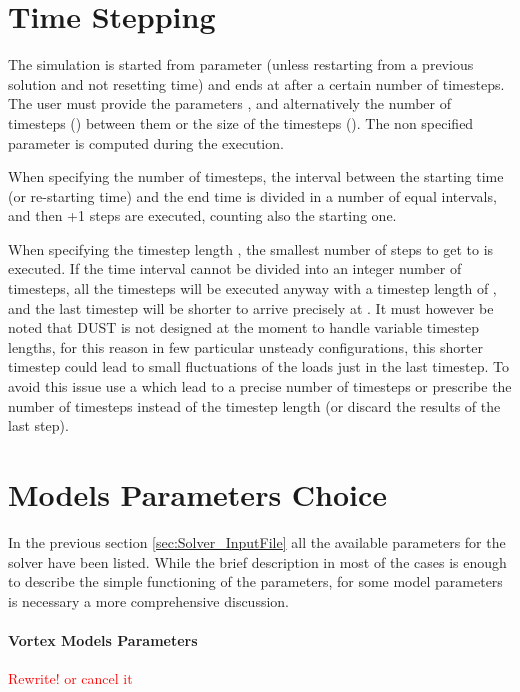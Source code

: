 \section{Time Stepping}
\label{sec:Time_Stepping}
The simulation is started from parameter  (unless restarting from a previous solution and not resetting time) and ends at  after a certain number of timesteps. The user must provide the parameters ,  and alternatively the number of timesteps () between them or the size of the timesteps (). The non specified parameter is computed during the execution.

When specifying the number of timesteps, the interval between the starting time (or re-starting time) and the end time is divided in a number  of equal intervals, and then +1 steps are executed, counting also the starting one.

When specifying the timestep length , the smallest number of steps to get to  is executed. If the time interval cannot be divided into an integer number of timesteps, all the timesteps will be executed anyway with a timestep length of , and the last timestep will be shorter to arrive precisely at . It must however be noted that DUST is not designed at the moment to handle variable timestep lengths, for this reason in few particular unsteady configurations, this shorter timestep could lead to small fluctuations of the loads just in the last timestep. To avoid this issue use a  which lead to a precise number of timesteps or prescribe the number of timesteps instead of the timestep length (or discard the results of the last step). 

\section{Models Parameters Choice}
\label{sec:Solver_ParametersChoice}
In the previous section \ref{sec:Solver_InputFile} all the available parameters for the \DUST{} solver have been listed. While the brief description in most of the cases is enough to describe the simple functioning of the parameters, for some model parameters is necessary a more comprehensive discussion. 

\paragraph{Vortex Models Parameters}
\textcolor{red}{Rewrite! or cancel it}

